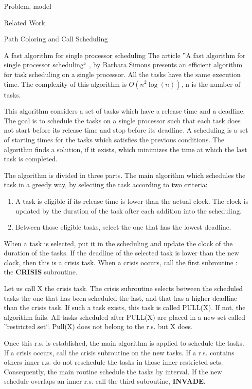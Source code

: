 \documentclass[a4paper,10pt]{report}
\begin{document}
\begin{chapter}{Problem, model}
\begin{section}{Related Work}
\begin{subsection}{Path Coloring and Call Scheduling}
\end{subsection}

\begin{subsection}{A fast algorithm for single processor scheduling}
The article ''A fast algorithm for single processor scheduling`` \cite{simons1978fast}, by Barbara Simons presents an efficient algorithm for task 
scheduling on a single processor. All the tasks have the same execution time. The complexity of this algorithm is $O(n^2\log(n))$, n is the number of tasks.

This algorithm considers a set of tasks which have a release time and a deadline. The goal is to schedule the tasks on a single processor such
that each task does not start before its release time and stop before its deadline.
A scheduling is a set of starting times for the tasks which satisfies the previous conditions.
The algorithm finds a solution, if it exists, which minimizes the time at which the last task is completed.

The algorithm is divided in three parts.
The main algorithm which schedules the task in a greedy way, by selecting the task according to two criteria:
\begin{enumerate}
 \item A task is eligible if its release time is lower than the actual clock. The clock is updated by the duration of the task after each addition into the scheduling.
 \item Between those eligible tasks, select the one that has the lowest deadline.
\end{enumerate}

When a task is selected, put it in the scheduling and update the clock of the duration of the tasks.
If the deadline of the selected task is lower than the new clock, then this is a crisis task.
When a crisis occurs, call the first subroutine : the {\bf CRISIS} subroutine.

Let us call X the crisis task.
The crisis subroutine selects between the scheduled tasks the one that has been scheduled the last, and that has a higher deadline than the crisis task.
If such a task exists, this task is called PULL(X). If not, the algorithm fails.
All tasks scheduled after PULL(X) are placed in a new set called ''restricted set``.
Pull(X) does not belong to the r.s. but X does.

Once this r.s. is established, the main algorithm is applied to schedule the tasks. If a crisis occurs, call the crisis subroutine on the new tasks.
If a r.s. contains others inner r.s. do not reschedule the tasks in those inner restricted sets. Consequently, the main routine schedule 
the tasks by interval. If the new schedule overlaps an inner r.s. call the third subroutine, {\bf INVADE}.


\end{subsection}
\end{section}
\end{chapter}
\end{document}
